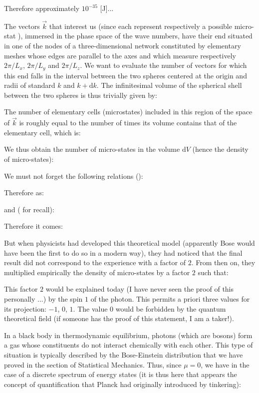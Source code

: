 	Therefore approximately $10^{-35}$ [J]...

	The vectors $\vec{k}$ that interest us (since each represent respectively a possible micro-stat ), immersed in the phase space of the wave numbers, have their end situated in one of the nodes of a three-dimensional network constituted by elementary meshes whose edges are parallel to the axes and which measure respectively $2\pi/L_x$, $2\pi/L_y$ and $2\pi/L_z$. We want to evaluate the number of vectors for which this end falls in the interval between the two spheres centered at the origin and radii of standard $k$ and $k+\mathrm{d}k$. The infinitesimal volume of the spherical shell between the two spheres is thus trivially given by:
	
	The number of elementary cells (microstates) included in this region of the space of $\vec{k}$ is roughly equal to the number of times its volume contains that of the elementary cell, which is:
	
	We thus obtain the number of micro-states in the volume $\mathrm{d}V$ (hence the density of micro-states):
	
	We must not forget the following relations ():
	
	Therefore as:
	
	and ( for recall):
	
	Therefore it comes:
	
	But when physicists had developed this theoretical model (apparently Bose would have been the first to do so in a modern way), they had noticed that the final result did not correspond to the experience with a factor of $2$. From then on, they multiplied empirically the density of micro-states by a factor $2$ such that:
	
	This factor $2$ would be explained today (I have never seen the proof of this personally ...) by the spin $1$ of the photon. This permits a priori three values for its projection: $-1$, $0$, $1$. The value $0$ would be forbidden by the quantum theoretical field (if someone has the proof of this statement, I am a taker!).

	In a black body in thermodynamic equilibrium, photons (which are bosons) form a gas whose constituents do not interact chemically with each other. This type of situation is typically described by the Bose-Einstein distribution that we have proved in the section of Statistical Mechanics. Thus, since $\mu=0$, we have in the case of a discrete spectrum of energy states (it is thus here that appears the concept of quantification that Planck had originally introduced by tinkering):
	
